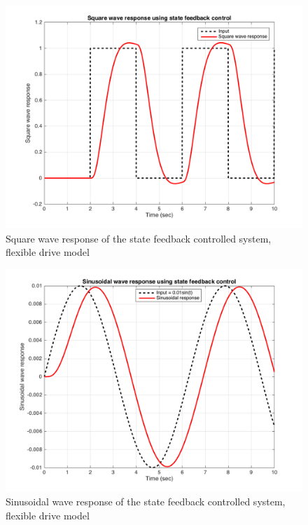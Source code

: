 \documentclass[a4paper, 12pt]{article}
\begin{document}
\begin{figure}[!htbp]
\centering
\includegraphics[scale = 0.3]{FlexibleCubicResponseStateFeedback}
\caption{Square wave response of the state feedback controlled system, flexible drive model}
\label{CubicResponseStateFeedback}
\end{figure}

\begin{figure}[!htbp]
\centering
\includegraphics[scale = 0.3]{FlexibleSinusoidalResponseStateFeedback}
\caption{Sinusoidal wave response of the state feedback controlled system, flexible drive model}
\label{FlexibleSinusoidalResponseStateFeedback}
\end{figure}
\end{document}
